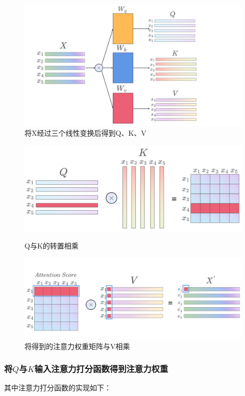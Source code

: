 \begin{figure}[h]
	\centering
	\includegraphics[width=0.75\columnwidth]{image/chap03/img308.png}
	\caption{将X经过三个线性变换后得到Q、K、V}
	\label{img308}
\end{figure}

\begin{figure}[h]
	\begin{minipage}[t]{0.5\linewidth}
		\centering
		\includegraphics[scale=0.25]{image/chap03/img309.png}
		\caption{Q与K的转置相乘}
		\label{img309}
	\end{minipage}%
	\begin{minipage}[t]{0.5\linewidth}
		\centering
		\includegraphics[scale=0.25]{image/chap03/img310.png}
		\caption{将得到的注意力权重矩阵与V相乘}
		\label{img310}
	\end{minipage}
\end{figure}

\subsubsection{将$Q$与$K$输入注意力打分函数得到注意力权重}
其中注意力打分函数的实现如下：


